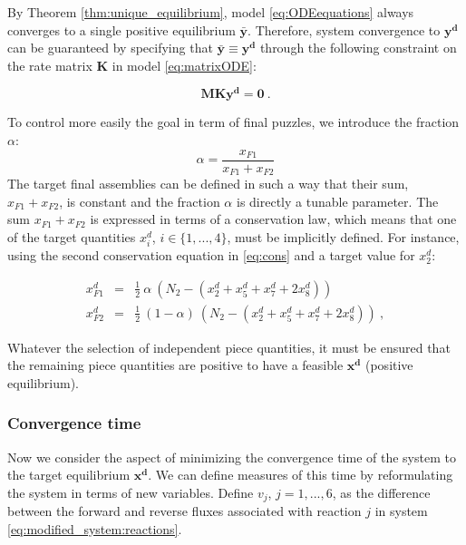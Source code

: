         By Theorem \ref{thm:unique_equilibrium}, model \eqref{eq:ODEequations} always converges to a single positive
        equilibrium $\mathbf{\bar{y}}$. Therefore, system convergence to
        $\mathbf{y^d}$ can be guaranteed by specifying that
        $\mathbf{\bar{y}} \equiv \mathbf{y^d}$ through the following
        constraint on the rate matrix $\mathbf{K}$ in model \eqref{eq:matrixODE}:

        \begin{equation}
            \mathbf{M}\mathbf{K}\mathbf{y^d} = \mathbf{0}~.
            \label{eq:equilConstr}
        \end{equation}

        To control more easily the goal in term of final puzzles, we introduce the fraction $\alpha$:
        \begin{equation} \label{eq:alpha}
            \alpha = \frac{x_{F1}}{x_{F1}+x_{F2}}
        \end{equation}
        The target final assemblies can be defined in such a way that their
        sum, $x_{F1}+x_{F2}$, is constant and the fraction $\alpha$ is directly a tunable parameter. The sum
        $x_{F1}+x_{F2}$ is expressed in terms of a conservation law, which
        means that one of the target quantities $x_i^d$, $i \in
        \{1,...,4\}$, must be implicitly defined. For instance, using the
        second conservation equation in \eqref{eq:cons} and a target
        value for $x_2^d$:

        \begin{eqnarray}
            x_{F1}^d &=& \tfrac{1}{2}~ \alpha ~\left(N_2-(x_2^d+x_5^d+x_7^d+2 x_8^d)\right)~ \\
            x_{F2}^d &=& \tfrac{1}{2}~ (1-\alpha) ~\left(N_2-(x_2^d+x_5^d+x_7^d+2 x_8^d)\right)~,
        \end{eqnarray}

        Whatever the selection of independent piece quantities, it must be
        ensured that the remaining piece quantities are positive to have a
        feasible $\mathbf{x^d}$ (positive equilibrium).


        \subsubsection{Convergence time} %
        \label{ssub:convergence_time}

        Now we consider the aspect of minimizing the convergence time of the
        system to the target equilibrium $\mathbf{x^d}$.  We can define
        measures of this time by reformulating the system in terms of new
        variables.  Define $v_j$, $j=1,...,6$, as the difference between
        the forward and reverse fluxes associated with reaction $j$ in
        system \eqref{eq:modified_system:reactions}.

